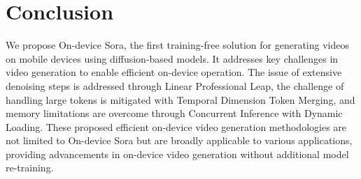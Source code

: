 \section{Conclusion}

We propose On-device Sora, the first training-free solution for generating videos on mobile devices using diffusion-based models. It addresses key challenges in video generation to enable efficient on-device operation. The issue of extensive denoising steps is addressed through Linear Professional Leap, the challenge of handling large tokens is mitigated with Temporal Dimension Token Merging, and memory limitations are overcome through Concurrent Inference with Dynamic Loading. These proposed efficient on-device video generation methodologies are not limited to On-device Sora but are broadly applicable to various applications, providing advancements in on-device video generation without additional model re-training.



